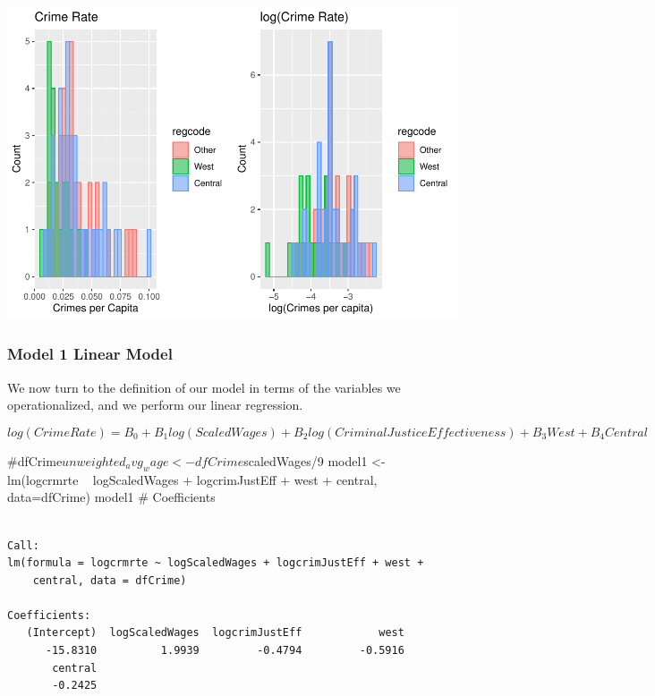 \documentclass[]{article}
\newenvironment{Shaded}{}{}
\newcommand{\CommentTok}[1]{\textcolor[rgb]{0.00,0.50,0.00}{#1}}
\newcommand{\DataTypeTok}[1]{#1}
\newcommand{\KeywordTok}[1]{\textcolor[rgb]{0.00,0.00,1.00}{#1}}
\newcommand{\NormalTok}[1]{#1}
\newcommand{\OperatorTok}[1]{#1}
\newcommand{\StringTok}[1]{\textcolor[rgb]{0.00,0.50,0.50}{#1}}
\begin{document}
\includegraphics{Bagnard_Gaustad_Hartman_Leung_Lab_3_files/figure-latex/unnamed-chunk-57-1.pdf}

\hypertarget{model-1-linear-model}{%
\subsubsection{Model 1 Linear Model}\label{model-1-linear-model}}

We now turn to the definition of our model in terms of the variables we
operationalized, and we perform our linear regression.

\[ log(Crime Rate) = B_0 + B_1log(Scaled Wages) + B_2log(Criminal Justice Effectiveness) + B_3West + B_4Central\]

\begin{Shaded}
\begin{Highlighting}[]
\CommentTok{#dfCrime$unweighted_avg_wage <- dfCrime$scaledWages/9}
\NormalTok{model1 <-}\StringTok{ }\KeywordTok{lm}\NormalTok{(logcrmrte }\OperatorTok{~}\StringTok{ }\NormalTok{logScaledWages }\OperatorTok{+}\StringTok{ }\NormalTok{logcrimJustEff }\OperatorTok{+}\StringTok{ }\NormalTok{west }\OperatorTok{+}\StringTok{ }\NormalTok{central, }\DataTypeTok{data=}\NormalTok{dfCrime)}
\NormalTok{model1 }\CommentTok{# Coefficients}
\end{Highlighting}
\end{Shaded}

\begin{verbatim}

Call:
lm(formula = logcrmrte ~ logScaledWages + logcrimJustEff + west + 
    central, data = dfCrime)

Coefficients:
   (Intercept)  logScaledWages  logcrimJustEff            west  
      -15.8310          1.9939         -0.4794         -0.5916  
       central  
       -0.2425  
\end{verbatim}
\end{document}
